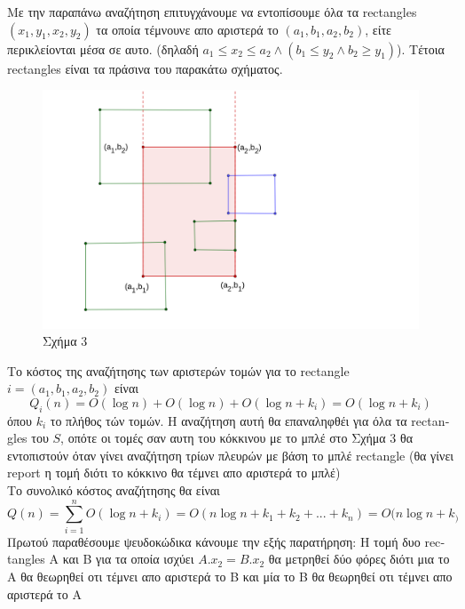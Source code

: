 \documentclass[12pt]{article}
\begin{document}
    Με την παραπάνω αναζήτηση επιτυγχάνουμε να εντοπίσουμε όλα τα \textlatin{rectangles} $(x_1,y_1,x_2,y_2)$ τα οποία τέμνουνε απο αριστερά το $(a_1,b_1,a_2,b_2)$, είτε περικλείονται μέσα σε αυτο.
    (δηλαδή $a_1\leq x_2 \leq a_2 \land \left(b_1\leq y_2 \land b_2 \geq y_1\right)$). Τέτοια \textlatin{rectangles} είναι τα πράσινα του παρακάτω σχήματος.
    \begin{figure}[H]
        \centering
        \includegraphics[scale = 0.6]{geogebra-export5.png}
        \caption*{Σχήμα 3}
    \end{figure}
    Το κόστος της αναζήτησης των αριστερών τομών για το \textlatin{rectangle} $i = (a_1,b_1,a_2,b_2)$ είναι 
    $$Q_i(n) = O(\log n) +O(\log n) + O(\log n + k_i) = O(\log n + k_i)$$
    όπου $k_i$ το πλήθος τών τομών. Η αναζήτηση αυτή θα επαναληφθέι για όλα τα \textlatin{rectangles} του $S$, οπότε οι τομές σαν αυτη του κόκκινου με το μπλέ στο Σχήμα 3 θα εντοπιστούν
    όταν γίνει αναζήτηση τρίων πλευρών με βάση το μπλέ \textlatin{rectangle} (θα γίνει \textlatin{report} η τομή διότι το κόκκινο θα τέμνει απο αριστερά το μπλέ) \\
    Το συνολικό κόστος αναζήτησης θα είναι 
    $$Q(n) = \sum_{i=1}^n O(\log n + k_i) = O(n\log n + k_1+k_2+...+k_n)=O(n\log n + k_)$$ 
    Πρωτού παραθέσουμε ψευδοκώδικα κάνουμε την εξής παρατήρηση: Η τομή δυο \textlatin{rectangles} Α και Β για τα οποία ισχύει $Α.x_2 = B.x_2$ θα μετρηθεί δύο φόρες διότι μια το Α θα θεωρηθεί οτι τέμνει απο αριστερά το Β
     και μία το Β θα θεωρηθεί οτι τέμνει απο αριστερά το Α 
\end{document}
